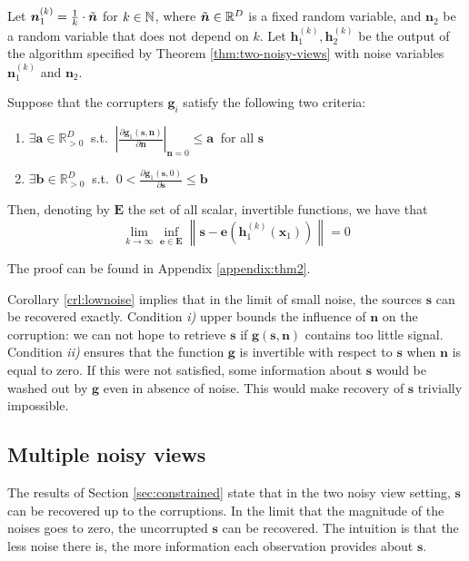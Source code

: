 \begin{corollary}
\label{crl:lownoise}
Let $\bm{n}_1^{(k)} = \frac{1}{k} \cdot  \Tilde{\bm{n}}$ for $k \in \mathbb{N}$, where $\Tilde{\bm{n}}\in\mathbb{R}^D$ is a fixed random variable, and $\bm{n}_2$ be a random variable that does not depend on $k$.
Let $\bm{h}_1^{(k)}, \bm{h}_2^{(k)}$ be the output of the algorithm specified by Theorem \ref{thm:two-noisy-views} with noise variables $\bm{n}_1^{(k)}$ and $\bm{n}_2$.

Suppose that the corrupters $\bm{g}_i$ satisfy the following two criteria:
\begin{enumerate}
    \item $\exists \bm{a}  \in \mathbb{R}_{> 0}^D \: $   s.t. $\: \left|\frac{\partial \bm{g}_1(\bm{s},\bm{n})}{\partial \bm{n}} \right|_{\bm{n}=0} \leq \bm{a} \: $ for all $\bm{s}$
    \item $\exists \bm{b}  \in \mathbb{R}_{> 0}^D \: $ s.t. $\: 0<\frac{\partial \bm{g}_1(\bm{s},0)}{\partial \bm{s}} \leq \bm{b}$
\end{enumerate}
Then, denoting by $\bm{E}$ the set of all scalar, invertible functions, we have that
\[
\lim_{k \to \infty} \inf_{\bm{e}\in \bm{E}} \left \|\bm{s} - \bm{e}(\bm{h}_1^{(k)}(\bm{x}_1)) \right \| = 0
\]
\end{corollary}
The proof can be found in Appendix \ref{appendix:thm2}.

Corollary \ref{crl:lownoise} implies that in the limit of small noise, the sources $\bm{s}$ can be recovered exactly.
Condition \textit{i)} upper bounds the influence of $\bm{n}$ on the corruption: we can not hope to retrieve $\bm{s}$ if $\bm{g}(\bm{s}, \bm{n})$ contains too little signal.
Condition \textit{ii)} ensures that the function $\bm{g}$ is invertible with respect to $\bm{s}$ when $\bm{n}$ is equal to zero.
If this were not satisfied, some information about $\bm{s}$ would be washed out by $\bm{g}$ even in absence of noise.
This would make recovery of $\bm{s}$ trivially impossible.


\subsection{Multiple noisy views}
\label{sec:multiple}

The results of Section \ref{sec:constrained} state that in the two noisy view setting, $\bm{s}$ can be recovered up to the corruptions.
In the limit that the magnitude of the noises goes to zero, the uncorrupted $\bm{s}$ can be recovered.
The intuition is that the less noise there is, the more information each observation provides about $\bm{s}$.

